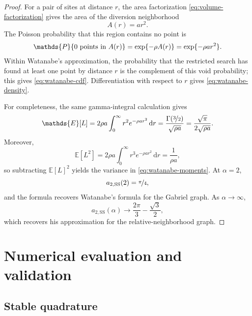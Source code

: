 \documentclass[a4paper,fleqn]{cas-dc}
\theoremstyle{definition}
\theoremstyle{remark}
\newcommand{\Pp}{\mathds{P}}
\newcommand{\E}{\mathds{E}}
\newcommand{\dd}{\,\mathrm{d}}
\newcommand{\0}{\mathbf{0}}
\begin{document}
\begin{proof}
For a pair of sites at distance $r$, the area factorization
\eqref{eq:volume-factorization} gives the area of the diversion neighborhood
\begin{equation}
    A(r)=a r^2.
\end{equation}
The Poisson probability that this region contains no point is
\begin{equation}
    \Pp\{0\text{ points in }A(r)\}\\
    =\exp\{-\rho A(r)\}
    =\exp\{-\rho a r^2\}.
\end{equation}
Within Watanabe's approximation, the probability that the restricted search
has found at least one point by distance $r$ is the complement of this void
probability; this gives \eqref{eq:watanabe-cdf}. Differentiation with respect to $r$ gives
\eqref{eq:watanabe-density}. 

For completeness, the same gamma-integral calculation gives
\begin{equation}
    \E[L]
    =2\rho a\int_0^\infty r^2e^{-\rho ar^2}\dd r
    =\frac{\Gamma(\nicefrac{3}{2})}{\sqrt{\rho a}}
    =\frac{\sqrt\pi}{2\sqrt{\rho a}}.
\end{equation}
Moreover,
\begin{equation}
    \E[L^2]
    =2\rho a\int_0^\infty r^3e^{-\rho ar^2}\dd r
    =\frac{1}{\rho a},
\end{equation}
so subtracting $\E[L]^2$ yields the variance in
\eqref{eq:watanabe-moments}. At $\alpha=2$,
\begin{equation}
a_{2,\mathrm{SS}}(2)=\nicefrac{\pi}{4},
\end{equation} 
and the formula recovers Watanabe's formula for
the Gabriel graph. As $\alpha\to\infty$,
\begin{equation}
    a_{2,\mathrm{SS}}(\alpha)
    \longrightarrow \frac{2\pi}{3}-\frac{\sqrt3}{2},
\end{equation}
which recovers his approximation for the relative-neighborhood graph.
\end{proof}

\section{Numerical evaluation and validation}
\label{sec:numerical}

\subsection{Stable quadrature}
\end{document}
